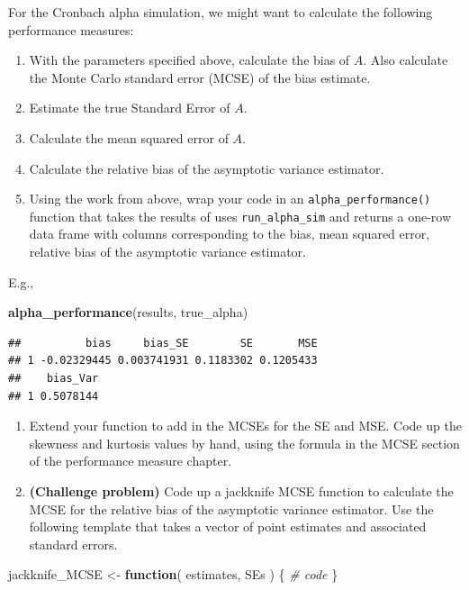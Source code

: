 \documentclass[
]{book}
\newenvironment{Shaded}{\begin{snugshade}}{\end{snugshade}}
\newcommand{\CommentTok}[1]{\textcolor[rgb]{0.56,0.35,0.01}{\textit{#1}}}
\newcommand{\ControlFlowTok}[1]{\textcolor[rgb]{0.13,0.29,0.53}{\textbf{#1}}}
\newcommand{\FunctionTok}[1]{\textcolor[rgb]{0.13,0.29,0.53}{\textbf{#1}}}
\newcommand{\NormalTok}[1]{#1}
\newcommand{\OtherTok}[1]{\textcolor[rgb]{0.56,0.35,0.01}{#1}}
\begin{document}
For the Cronbach alpha simulation, we might want to calculate the following performance measures:

\begin{enumerate}
\def\labelenumi{\arabic{enumi}.}
\item
  With the parameters specified above, calculate the bias of \(A\). Also calculate the Monte Carlo standard error (MCSE) of the bias estimate.
\item
  Estimate the true Standard Error of \(A\).
\item
  Calculate the mean squared error of \(A\).
\item
  Calculate the relative bias of the asymptotic variance estimator.
\item
  Using the work from above, wrap your code in an \texttt{alpha\_performance()} function that takes the results of uses \texttt{run\_alpha\_sim} and returns a one-row data frame with columns corresponding to the bias, mean squared error, relative bias of the asymptotic variance estimator.
\end{enumerate}

E.g.,

\begin{Shaded}
\begin{Highlighting}[]
\FunctionTok{alpha\_performance}\NormalTok{(results, true\_alpha)}
\end{Highlighting}
\end{Shaded}

\begin{verbatim}
##          bias     bias_SE        SE       MSE
## 1 -0.02329445 0.003741931 0.1183302 0.1205433
##    bias_Var
## 1 0.5078144
\end{verbatim}

\begin{enumerate}
\def\labelenumi{\arabic{enumi}.}
\setcounter{enumi}{5}
\item
  Extend your function to add in the MCSEs for the SE and MSE. Code up the skewness and kurtosis values by hand, using the formula in the MCSE section of the performance measure chapter.
\item
  \textbf{(Challenge problem)} Code up a jackknife MCSE function to calculate the MCSE for the relative bias of the asymptotic variance estimator.
  Use the following template that takes a vector of point estimates and associated standard errors.
\end{enumerate}

\begin{Shaded}
\begin{Highlighting}[]
\NormalTok{jackknife\_MCSE }\OtherTok{\textless{}{-}} \ControlFlowTok{function}\NormalTok{( estimates, SEs ) \{}
  \CommentTok{\# code}
\NormalTok{\}}
\end{Highlighting}
\end{Shaded}
\end{document}
